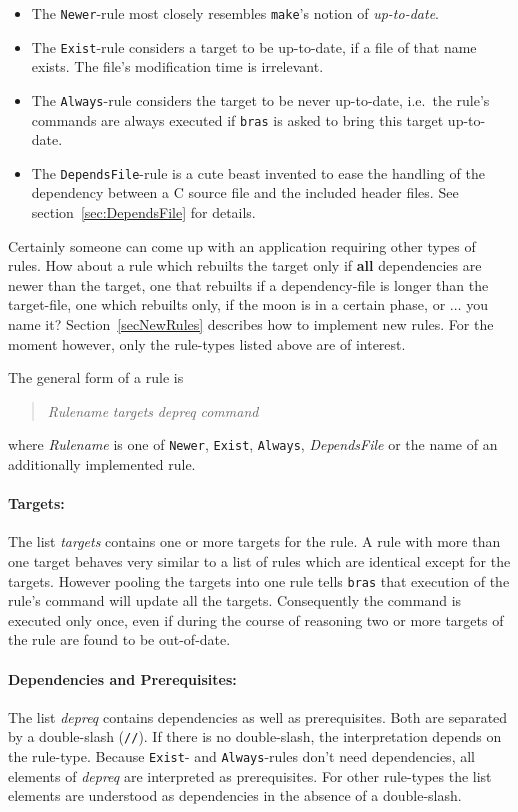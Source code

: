 \documentclass[12pt]{article}
\newcommand{\bras}{\texttt{bras}}
\newcommand{\make}{\texttt{make}}
\begin{document}
\begin{itemize}
\item 
The \texttt{Newer}-rule most closely resembles \make's notion of
\textit{up-to-date}.
\item 
The \texttt{Exist}-rule considers a target to be up-to-date,
if a file of that name exists. The file's modification time is irrelevant.
\item 
The \texttt{Always}-rule considers the target to be never
up-to-date, i.e.\ the rule's commands are always executed if
\bras{} is asked to bring this target up-to-date.
\item
The \texttt{DependsFile}-rule is a cute beast invented to ease the
handling of the dependency between a C source file and the included
header files. See section~\ref{sec:DependsFile} for details. 
\end{itemize}

Certainly someone can come up with an application requiring other
types of rules. How about a rule which rebuilts
the target only if \textbf{all} dependencies are newer than the
target, one that rebuilts if a dependency-file is longer than the
target-file, one which rebuilts only, if the moon is in a certain
phase, or $\ldots$ you name it?  Section~\ref{secNewRules} describes
how to implement new rules. For the moment however, only the
rule-types listed above are of interest.

The general form of a rule is
\begin{quote}
\textit{Rulename} \textit{targets} \textit{depreq} \textit{command}
\end{quote}
where \textit{Rulename} is one of \texttt{Newer}, \texttt{Exist},
\texttt{Always}, \textit{DependsFile} or the name of an additionally
implemented rule. 

\paragraph{Targets:}
The list \textit{targets} contains one or more targets for the rule. A
rule with more than one target behaves very similar to a list of rules
which are identical except for the targets. However pooling the
targets into one rule tells \bras{} that execution of the rule's
command will update all the targets. Consequently the command
is executed only once, even if during the course of reasoning two or
more targets of the rule are found to be out-of-date.

\paragraph{Dependencies and Prerequisites:}
The list \textit{depreq} contains dependencies as well as
prerequisites. Both are separated by a double-slash (\texttt{//}). If
there is no double-slash, the interpretation depends on the rule-type.
Because \texttt{Exist}- and \texttt{Always}-rules don't need
dependencies, all elements of \textit{depreq} are interpreted as
prerequisites. For other rule-types the list elements are understood as
dependencies in the absence of a double-slash.
\end{document}
